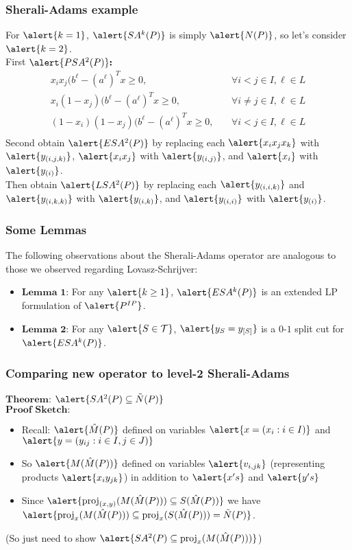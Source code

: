 \documentclass{beamer}
\DeclareMathOperator{\proj}{proj}
\begin{document}
\begin{frame}
\frametitle{Sherali-Adams example}
For $\alert{k=1}$, $\alert{SA^k(P)}$ is simply $\alert{N(P)}$, so let's consider $\alert{k=2}$.\\
First $\alert{PSA^2(P)}\textbf{:}$
\alert{\begin{align*}
x_ix_j(b^\ell -(a^\ell)^Tx \geq 0,&\ &\forall i<j \in I, \ell \in L \\
x_i(1-x_j)(b^\ell -(a^\ell)^Tx \geq 0,&\ &\forall i\neq j \in I, \ell \in L \\
(1-x_i)(1-x_j)(b^\ell -(a^\ell)^Tx \geq 0,&\ &\forall i<j \in I, \ell \in L \\
\end{align*}}
Second obtain $\alert{ESA^2(P)}$ by replacing each $\alert{x_ix_jx_k}$ with $\alert{y_{(i,j,k)}}$, $\alert{x_ix_j}$ with $\alert{y_{(i,j)}}$, and $\alert{x_i}$ with $\alert{y_{(i)}}$.\\
Then obtain $\alert{LSA^2(P)}$ by replacing each $\alert{y_{(i,i,k)}}$ and $\alert{y_{(i,k,k)}}$ with $\alert{y_{(i,k)}}$, and $\alert{y_{(i,i)}}$ with $\alert{y_{(i)}}$.
\end{frame}

\begin{frame}
\frametitle{Some Lemmas}
The following observations about the Sherali-Adams operator are analogous to those we observed regarding Lovasz-Schrijver:\\
\begin{itemize}
\item$\textbf{Lemma 1:}$ For any $\alert{k \geq 1}$, $\alert{ESA^k(P)}$ is an extended LP formulation of $\alert{P^{IP}}$.
\item$\textbf{Lemma 2:}$ For any $\alert{S \in \mathcal{T}}$, $\alert{y_S = y_{[S]}}$ is a $0$-$1$ split cut for $\alert{ESA^k(P)}$.
\end{itemize}
\end{frame}
\begin{frame}
\frametitle{Comparing new operator to level-2 Sherali-Adams}
$\textbf{Theorem:}$ $\alert{SA^2(P) \subseteq \tilde{N}(P)}$\\
$\textbf{Proof Sketch:}$
\begin{itemize}
\item Recall: $\alert{\hat{M}(P)}$ defined on variables $\alert{x = (x_i : i \in I)}$ and $\alert{y = (y_{ij}: i \in I, j \in J)}$
\item So $\alert{M(\hat{M}(P))}$ defined on variables $\alert{v_{i,jk}}$ (representing products $\alert{x_iy_{jk}}$) in addition to $\alert{x's}$ and $\alert{y's}$
\item Since $\alert{\proj_{(x,y)}(M(\hat{M}(P))) \subseteq S(\hat{M}(P))}$ we have $\alert{\proj_x (M(\hat{M}(P))) \subseteq \proj_x (S(\hat{M}(P))) = \tilde{N}(P)}$.
\end{itemize}
(So just need to show $\alert{SA^2(P) \subseteq \proj_x(M(\hat{M}(P)))}$)
\end{frame}
\end{document}
